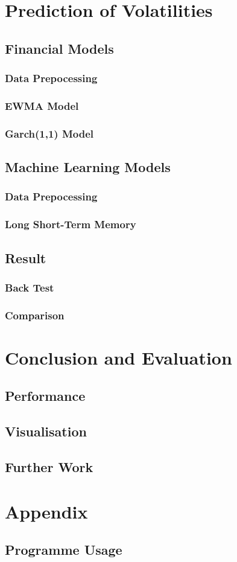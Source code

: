 \documentclass[11pt]{article} %
\theoremstyle{plain}
\theoremstyle{definition}
\begin{document}
\clearpage

\section{Prediction of Volatilities}
\subsection{Financial Models}
\subsubsection{Data Prepocessing}
\subsubsection{EWMA Model}
\subsubsection{Garch(1,1) Model}
\subsection{Machine Learning Models}
\subsubsection{Data Prepocessing}
\subsubsection{Long Short-Term Memory}
\subsection{Result}
\subsubsection{Back Test}
\subsubsection{Comparison}

\section{Conclusion and Evaluation}
\subsection{Performance}
\subsection{Visualisation}
\subsection{Further Work}

\section{Appendix}
\subsection{Programme Usage}



\end{document}
